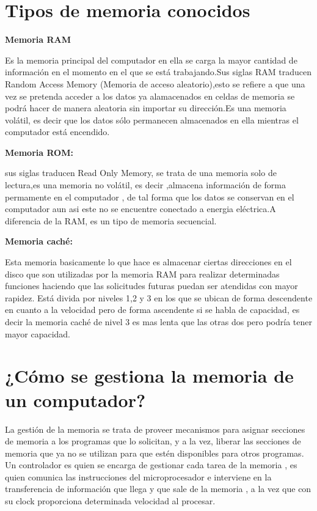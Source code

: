 \documentclass{article}
\begin{document}
\section{Tipos de memoria conocidos} \label{contenido}
\textbf{Memoria RAM}

Es la memoria principal del computador en ella se carga la mayor cantidad de información en el momento en el que se está trabajando.Sus siglas RAM traducen Random Access
Memory (Memoria de acceso aleatorio),esto se refiere a que una vez se pretenda acceder a los datos ya alamacenados en celdas de memoria se podrá hacer de manera aleatoria 
sin importar su dirección.Es una memoria volátil, es decir que los datos sólo permanecen almacenados en ella mientras el computador está encendido.


\textbf{Memoria ROM:}

sus siglas traducen Read Only Memory, se trata de una memoria solo de lectura,es una memoria no volátil, es decir ,almacena información de forma permamente en el
computador , de tal forma que los datos se conservan en el computador aun asi este no se encuentre conectado a energia eléctrica.A diferencia de la RAM, es un tipo de memoria secuencial.  

\textbf{Memoria caché:}

Esta memoria basicamente lo que hace es almacenar ciertas direcciones en el disco que son utilizadas por la memoria RAM para realizar determinadas funciones haciendo que las solicitudes futuras puedan ser atendidas con mayor rapidez. Está divida por niveles 1,2 y 3 en los que se ubican de forma descendente en cuanto a la velocidad pero de forma ascendente si se habla de capacidad, es decir la memoria caché de nivel 3 es mas lenta que las otras dos pero podría tener mayor capacidad.


\section{¿Cómo se gestiona la memoria de un computador?} \label{contenido}
La gestión de la memoria se trata de proveer mecanismos para asignar secciones de memoria a los programas que lo solicitan,  y a la vez, liberar las secciones de memoria
que ya no se utilizan para que estén disponibles para otros programas. Un controlador es quien se encarga de gestionar cada tarea de la memoria , es quien comunica las instrucciones del microprocesador e interviene en la transferencia de información que llega y que sale de la memoria , a la vez que con su clock proporciona determinada velocidad al procesar.
\cite{memoria}
\end{document}
